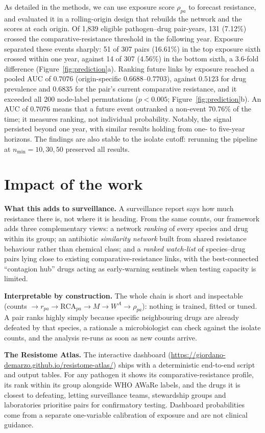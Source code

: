 \documentclass[10pt]{article}
\newcommand{\rca}{\mathrm{RCA}}
\begin{document}
As detailed in the methods, we can use exposure score \(\rho_{pa}\) to forecast resistance, and evaluated it in a rolling-origin design that rebuilds the network and the scores at each origin. Of 1{,}839 eligible pathogen--drug pair-years, 131 (7.12\%) crossed the comparative-resistance threshold in the following year. Exposure separated these events sharply: 51 of 307 pairs (16.61\%) in the top exposure sixth crossed within one year, against 14 of 307 (4.56\%) in the bottom sixth, a 3.6-fold difference (Figure~\ref{fig:prediction}a). Ranking future links by exposure reached a pooled AUC of \(0.7076\) (origin-specific \(0.6688\)--\(0.7703\)), against \(0.5123\) for drug prevalence and \(0.6835\) for the pair's current comparative resistance, and it exceeded all 200 node-label permutations (\(p<0.005\); Figure~\ref{fig:prediction}b). An AUC of \(0.7076\) means that a future event outranked a non-event 70.76\% of the time; it measures ranking, not individual probability. Notably, the signal persisted beyond one year, with similar results holding from one- to five-year horizons. The findings are also stable to the isolate cutoff: rerunning the pipeline at \(n_{\min}=10,30,50\) preserved all results.

\section*{Impact of the work}
\textbf{What this adds to surveillance.} A surveillance report says how much resistance there is, not where it is heading. From the same counts, our framework adds three complementary views: a network \emph{ranking} of every species and drug within its group; an antibiotic \emph{similarity network} built from shared resistance behaviour rather than chemical class; and a \emph{ranked watch-list} of species--drug pairs lying close to existing comparative-resistance links, with the best-connected ``contagion hub'' drugs acting as early-warning sentinels when testing capacity is limited.

\textbf{Interpretable by construction.} The whole chain is short and inspectable (counts \(\rightarrow r_{pa}\rightarrow\rca_{pa}\rightarrow M\rightarrow W^A\rightarrow\rho_{pa}\)): nothing is trained, fitted or tuned. A pair ranks highly simply because specific neighbouring drugs are already defeated by that species, a rationale a microbiologist can check against the isolate counts, and the analysis re-runs as soon as new counts arrive.

\textbf{The Resistome Atlas.} The interactive dashboard (\url{https://giordano-demarzo.github.io/resistome-atlas/}) ships with a deterministic end-to-end script and output tables. For any pathogen it shows its comparative-resistance profile, its rank within its group alongside WHO AWaRe labels, and the drugs it is closest to defeating, letting surveillance teams, stewardship groups and laboratories prioritise pairs for confirmatory testing. Dashboard probabilities come from a separate one-variable calibration of exposure and are not clinical guidance.
\end{document}
